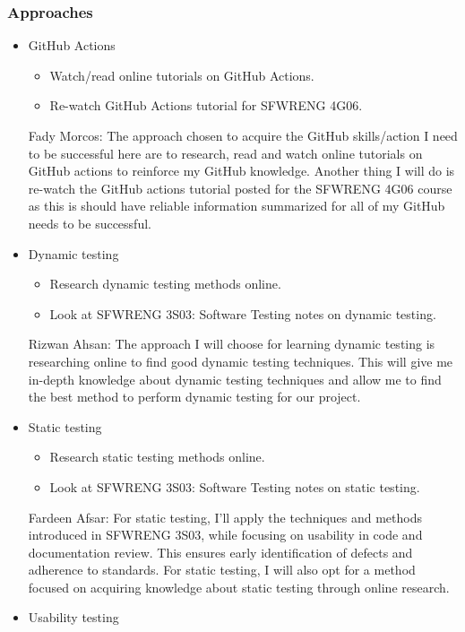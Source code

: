 \documentclass[12pt, titlepage]{article}
\begin{document}
\subsubsection{Approaches}
\begin{itemize}
    \item GitHub Actions
    \begin{itemize}
        \item Watch/read online tutorials on GitHub Actions.
        \item Re-watch GitHub Actions tutorial for SFWRENG 4G06.
    \end{itemize}
    Fady Morcos: The approach chosen to acquire the GitHub skills/action I need to be successful here are to research, read and watch online tutorials on GitHub actions to reinforce my GitHub knowledge. Another thing I will do is re-watch the GitHub actions tutorial posted for the SFWRENG 4G06 course as this is should have reliable information summarized for all of my GitHub needs to be successful.
    \item Dynamic testing
    \begin{itemize}
        \item Research dynamic testing methods online.
        \item Look at SFWRENG 3S03: Software Testing notes on dynamic testing.
    \end{itemize}
    Rizwan Ahsan: The approach I will choose for learning dynamic testing is researching online to find good dynamic testing techniques. This will give me in-depth knowledge about dynamic testing techniques and allow me to find the best method to perform dynamic testing for our project.
    \item Static testing
    \begin{itemize}
        \item Research static testing methods online.
        \item Look at SFWRENG 3S03: Software Testing notes on static testing.
    \end{itemize}
    Fardeen Afsar: For static testing, I'll apply the techniques and methods introduced in SFWRENG 3S03, while focusing on usability in code and documentation review. This ensures early identification of defects and adherence to standards.  For static testing, I will also opt for a method focused on acquiring knowledge about static testing through online research.
    \item Usability testing
    \begin{itemize}

\end{itemize}
\end{itemize}
\end{document}

